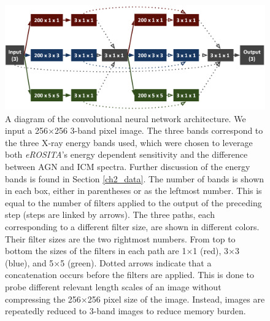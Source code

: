 \begin{figure}
    \centering
    \includegraphics[width=\textwidth]{Ch2_Super_Obs/1skip.png}
    \caption{A diagram of the convolutional neural network architecture. We input a 256$\times$256 3-band pixel image. The three bands correspond to the three X-ray energy bands used, which were chosen to leverage both \textit{eROSITA}'s energy dependent sensitivity and the difference between AGN and ICM spectra. Further discussion of the energy bands is found in Section \ref{ch2_data}. The number of bands is shown in each box, either in parentheses or as the leftmost number. This is equal to the number of filters applied to the output of the preceding step (steps are linked by arrows). The three paths, each corresponding to a different filter size, are shown in different colors. Their filter sizes are the two rightmost numbers. From top to bottom the sizes of the filters in each path are 1$\times$1 (red), 3$\times$3 (blue), and 5$\times$5 (green). Dotted arrows indicate that a concatenation occurs before the filters are applied. This is done to probe different relevant length scales of an image without compressing the 256$\times$256 pixel size of the image. Instead, images are repeatedly reduced to 3-band images to reduce memory burden.}
\label{fig:Algorithm}
\end{figure}


